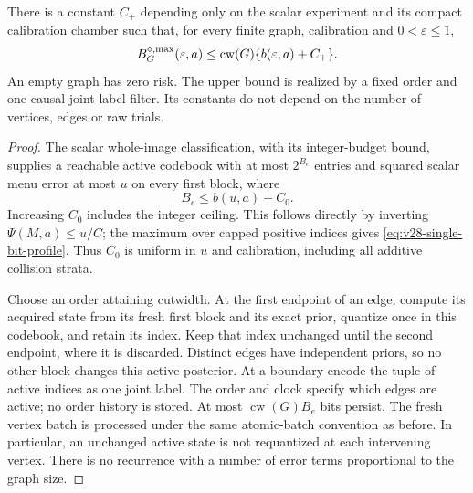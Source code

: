 \begin{proposition}
\label{prop:v28-uniform-upper}
There is a constant $C_+$ depending only on the scalar experiment and
its compact calibration chamber such that, for every finite graph,
calibration and $0<\varepsilon\le1$,
\begin{equation}\label{eq:v28-uniform-upper}
 B^{\diamond,\rm max}_G(\varepsilon,a)
       \le \operatorname{cw}(G)
                                 \{b(\varepsilon,a)+C_+\}.
\end{equation}
An empty graph has zero risk. The upper bound is realized by a fixed
order and one causal joint-label filter. Its constants do not depend
on the number of vertices, edges or raw trials.
\end{proposition}
\begin{proof}
The scalar whole-image classification, with its integer-budget bound,
supplies a reachable active codebook with at most $2^{B_e}$ entries
and squared scalar menu error at most $u$ on every first block, where
\[
                  B_e\le b(u,a)+C_0.
\]
Increasing $C_0$ includes the integer ceiling. This follows directly
by inverting $\Psi(M,a)\le u/C$; the maximum over capped positive
indices gives \eqref{eq:v28-single-bit-profile}. Thus $C_0$ is uniform
in $u$ and calibration, including all additive collision strata.

Choose an order attaining cutwidth. At the first endpoint of an edge,
compute its acquired state from its fresh first block and its exact
prior, quantize once in this codebook, and retain its index. Keep that
index unchanged until the second endpoint, where it is discarded.
Distinct edges have independent priors, so no other block changes
this active posterior. At a boundary encode the tuple of active
indices as one joint label. The order and clock specify which edges
are active; no order history is stored. At most
$\operatorname{cw}(G)B_e$ bits persist. The fresh vertex batch is
processed under the same atomic-batch convention as before. In
particular, an unchanged active state is not requantized at each
intervening vertex. There is no recurrence with a number of error
terms proportional to the graph size.


\end{proof}
